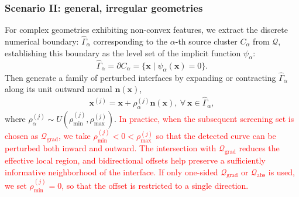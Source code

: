 \documentclass{article}
\newcommand{\red}[1]{\textcolor{red}{#1}}
\theoremstyle{plain}
\theoremstyle{definition}
\begin{document}
{\subsubsection{ {Scenario II: general, irregular geometries}}
 {For complex geometries exhibiting non-convex features, we extract the discrete numerical boundary: $\hat{\Gamma}_\alpha$ corresponding to the $\alpha$-th source cluster $C_\alpha$ from $\mathcal{Q}$, establishing this boundary as the level set of the implicit function $\psi_\alpha$:
$$\hat{\Gamma}_\alpha = \partial C_\alpha = \{ \boldsymbol{x} \mid \psi_\alpha(\boldsymbol{x}) = 0 \}.$$
Then generate a family of perturbed interfaces by expanding or contracting $\hat{\Gamma}_\alpha$ along its unit outward normal $\boldsymbol{n}(\boldsymbol{x})$,}
\begin{align}
\label{general}\boldsymbol{x}^{(j)}=\boldsymbol{x}+ \rho ^{(j)}_\alpha \boldsymbol{n}(\boldsymbol{x}) ,  \ \forall \ \boldsymbol{x} \in  {\hat{\Gamma}_{\alpha}},
\end{align}
where $\rho^{(j)}_\alpha \sim U(\rho^{(j)}_{\min},  \rho^{(j)}_{\max})$. \red{In practice, when the subsequent screening set is chosen as $\mathcal{Q}_{\mathrm{grad}}$, we take $\rho^{(j)}_{\min}<0<\rho^{(j)}_{\max}$ so that the detected curve can be perturbed both inward and outward. The intersection with $\mathcal{Q}_{\mathrm{grad}}$ reduces the effective local region, and bidirectional offsets help preserve a sufficiently informative neighborhood of the interface. If only one-sided $\mathcal{Q}_{\mathrm{grad}}$ or $\mathcal{Q}_{\mathrm{abs}}$ is used, we set $\rho^{(j)}_{\min}=0$, so that the offset is restricted to a single direction.}

}
\end{document}
